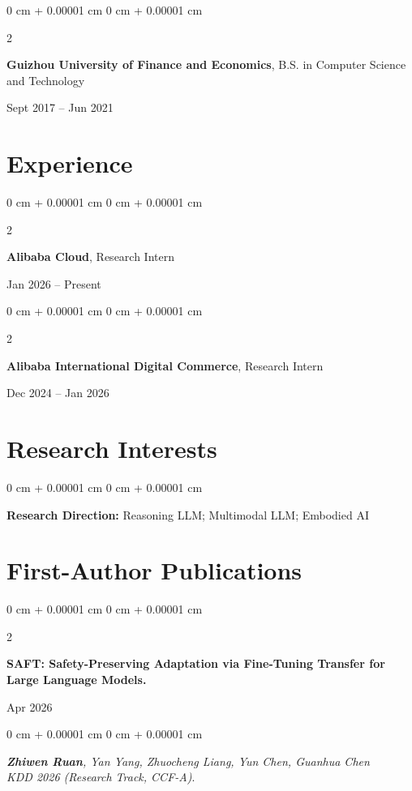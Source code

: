 \documentclass[10pt, letterpaper]{article}
\newenvironment{onecolentry}{
    \begin{adjustwidth}{
        0 cm + 0.00001 cm
    }{
        0 cm + 0.00001 cm
    }
}{
    \end{adjustwidth}
} %
\newenvironment{twocolentry}[2][]{
    \onecolentry
    \def\secondColumn{#2}
    \setcolumnwidth{\fill, 4.5 cm}
    \begin{paracol}{2}
}{
    \switchcolumn \raggedleft \secondColumn
    \end{paracol}
    \endonecolentry
} %
\begin{document}
        \vspace{0.15 cm}
        \begin{twocolentry}{Sept 2017 -- Jun 2021}
            \textbf{Guizhou University of Finance and Economics}, B.S. in Computer Science and Technology
        \end{twocolentry}

    \section{Experience}
        \begin{twocolentry}{Jan 2026 -- Present}
            \textbf{Alibaba Cloud}, Research Intern
        \end{twocolentry}

        \vspace{0.10 cm}
        \begin{twocolentry}{Dec 2024 -- Jan 2026}
            \textbf{Alibaba International Digital Commerce}, Research Intern
        \end{twocolentry}

    \section{Research Interests}
        \begin{onecolentry}
            \textbf{Research Direction:} Reasoning LLM; Multimodal LLM; Embodied AI
        \end{onecolentry}

    \newcommand{\pubitem}[4]{
        \vspace{0.2cm}
        \begin{twocolentry}{#1}
            \textbf{#2}
        \end{twocolentry}
        \vspace{0.05cm}
        \begin{onecolentry}
            \textit{#3} \\
            {\small #4}
        \end{onecolentry}
    }

    \section{First-Author Publications}

    \pubitem{Apr 2026}{
    SAFT: Safety-Preserving Adaptation via Fine-Tuning Transfer for Large Language Models.
    }{
    \textbf{Zhiwen Ruan}, Yan Yang, Zhuocheng Liang, Yun Chen, Guanhua Chen
    }{
    \textit{KDD 2026 (Research Track, CCF-A)}.
    }
\end{document}
